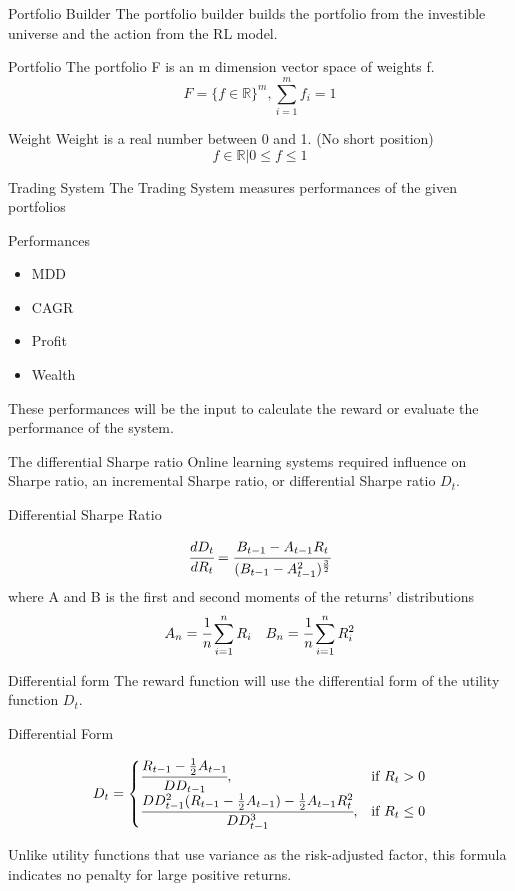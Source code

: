 \begin{frame}{Portfolio Builder}
The portfolio builder builds the portfolio from the investible universe and the action from the RL model.
\\
\begin{block}{Portfolio}
The portfolio F is an m dimension vector space of weights f.
\[
    F = \{ {f \in \mathbb{R} } \} ^m,
    \sum_{i=1}^m {f_i} =1
\]
\end{block}
\begin{block}{Weight}
Weight is a real number between 0 and 1. \alert{(No short position)}
\[
    f \in \mathbb{R} | 0 \leq f \leq 1 
\]
\end{block}
\end{frame}




\begin{frame}{Trading System}
The Trading System measures performances of the given portfolios
\begin{block}{Performances}
\begin{itemize}
    \item MDD
    \item CAGR
    \item Profit
    \item Wealth
\end{itemize}
\end{block}
These performances will be the input to calculate the reward or evaluate the performance of the system. 
\end{frame}


\begin{frame}{The differential Sharpe ratio}
Online learning systems required influence on Sharpe ratio, an incremental Sharpe ratio, or differential Sharpe ratio \(D_t\).
\begin{block}{Differential Sharpe Ratio}

\[
\cfrac{d D_t}{d R_t} = 
\cfrac{B_{t-1}-A_{t-1} R_t}{(B_{t-1}-A_{t-1}^2)^\frac{3}{2}}
\]
where
A and B is the first and second moments of the returns' distributions
\[ A_n = \cfrac{1}{n}\sum_{i=1}^nR_i\quad
B_n = \cfrac{1}{n}\sum_{i=1}^nR_i^2
\]
\end{block}
\end{frame}


\begin{frame}{Differential form}
The reward function will use the differential form of the utility function \(D_t\).

\begin{block}{Differential Form}

\[
D_t = 
\begin{cases}
    \cfrac{R_{t-1} -\frac{1}{2}A_{t-1}}{DD_{t-1}},&\text{if  }R_t > 0\\
    \cfrac{DD_{t-1}^2 (R_{t-1}-\frac{1}{2}A_{t-1})  -\frac{1}{2}A_{t-1} R_t^2}{DD_{t-1}^3},&\text{if  }R_t \leq 0
\end{cases}
\]
\end{block}
Unlike utility functions that use variance as the risk-adjusted factor, this formula indicates no penalty for large positive returns. 

\end{frame}
